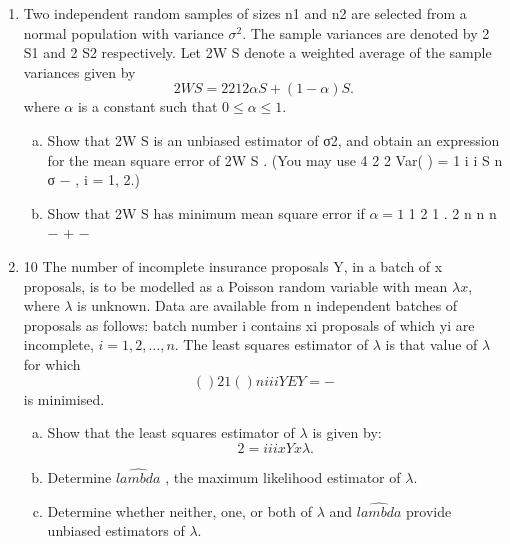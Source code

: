 \documentclass[a4paper,12pt]{article}
\begin{document}
\begin{enumerate}
\item Two independent random samples of sizes n1 and n2 are selected from a normal
population with variance $\sigma^2$. The sample variances are denoted by 2
S1 and 2
S2
respectively. Let 2W
S denote a weighted average of the sample variances given by
\[ 2W
S = 2 2
1 2 \alpha S + (1 − \alpha) S .\]
where $\alpha$ is a constant such that $0 \leq \alpha \leq 1$.
\begin{enumerate}[(a)]
\item Show that 2W
S is an unbiased estimator of σ2, and obtain an expression for
the mean square error of 2W
S .
(You may use
4
2 2
Var( ) =
1 i
i
S
n
σ
−
, i = 1, 2.) 
\item Show that 2W
S has minimum mean square error if $\alpha = 1$
1 2
1
.
2
n
n n
−
+ −
\end{enumerate}

\item 10 The number of incomplete insurance proposals Y, in a batch of x proposals, is to
be modelled as a Poisson random variable with mean $\lambda x$, where $\lambda$ is unknown.
Data are available from n independent batches of proposals as follows: batch
number i contains xi proposals of which yi are incomplete, $i = 1,2, \ldots, n$.
The least squares estimator of $\lambda$ is that value of $\lambda$for which
\[( )2
1
( )
n
i i
i
Y EY
=
 −\]
is minimised.
\begin{enumerate}[(a)]
\item Show that the least squares estimator of $\lambda$ is given by:
\[2 = i i
i
x Y
x
\lambda
 .\] 
\item Determine $\hat{lambda}$ , the maximum likelihood estimator of $\lambda$. 
\item Determine whether neither, one, or both of $\lambda$ and $\hat{lambda}$ provide unbiased
estimators of $\lambda$. 
\end{enumerate}



\end{enumerate}
\end{document}

